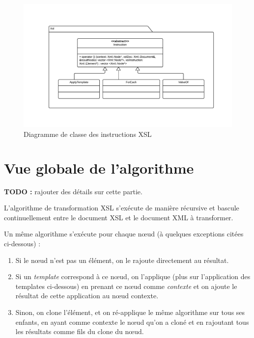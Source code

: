 \begin{landscape}
\begin{figure}[h!]
    \centering
    \includegraphics[width=\linewidth]{images/xsl-uml.pdf}
    \caption{Diagramme de classe des instructions XSL}
    \label{xslClassDiagram}
\end{figure}
\end{landscape}


\section{Vue globale de l'algorithme}

\textbf{TODO :} rajouter des détails sur cette partie.

L'algorithme de transformation XSL s’exécute de manière récursive et bascule continuellement entre le document XSL et le document XML à transformer.

Un même algorithme s'exécute pour chaque nœud (à quelques exceptions citées ci-dessous) :

\begin{enumerate}
    \item Si le nœud n'est pas un élément, on le rajoute directement au résultat.
    \item Si un \textit{template} correspond à ce nœud, on l'applique (plus sur l'application des templates ci-dessous) en prenant ce nœud comme \textit{contexte} et on ajoute le résultat de cette application au nœud contexte.
    \item Sinon, on clone l'élément, et on ré-applique le même algorithme sur tous ses enfants, en ayant comme contexte le nœud qu'on a cloné et en rajoutant tous les résultats comme fils du clone du nœud.
\end{enumerate}

